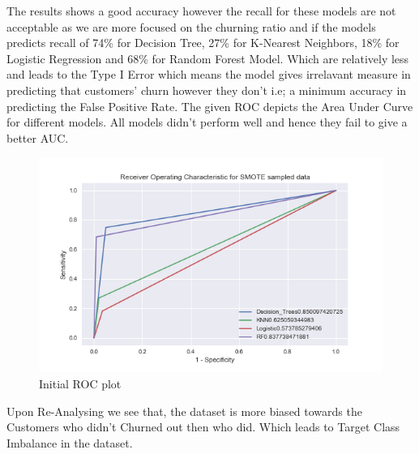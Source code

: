 \documentclass[a4paper,12pt]{report}
\begin{document}
The results shows a good accuracy however the recall for these models are not acceptable as  we are more focused on the churning ratio and if the models predicts recall of 74\% for Decision Tree, 27\% for K-Nearest Neighbors, 18\% for Logistic Regression and 68\% for Random Forest Model. Which are relatively less and leads to the Type I Error which means the model gives irrelavant measure  in predicting that customers' churn however they don't  i.e; a minimum accuracy in predicting the False Positive Rate. The given ROC depicts the Area Under Curve for different models. All models didn't perform well and hence they fail to  give a better AUC.
\begin{figure}[h]
\vspace{-5pt}
\centering
\includegraphics[scale = 0.7]{Imb_ROC.PNG}
\caption{Initial ROC plot}
\label{fig:3.3}
\end{figure}
\FloatBarrier
Upon Re-Analysing we see that, the dataset is more biased towards the Customers who didn't Churned out then who did. Which leads to Target Class Imbalance in the dataset.
\end{document}
